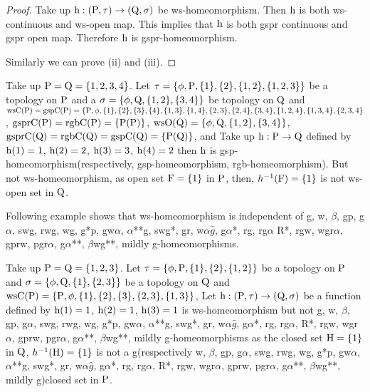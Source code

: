\begin{proof}
Take up $\mathrm{h}: (\mathrm{P},\tau)\to (\mathrm{Q}, \sigma)$ be ws-homeomorphism. Then $\mathrm{h}$ is both ws-continuous and ws-open map. This implies that $\mathrm{h}$ is both gspr continuous and gspr open map. Therefore $\mathrm{h}$ is gspr-homeomorphism.

Similarly we can prove (ii) and (iii).
\end{proof}

\begin{exm}\label{exam5.2.10}
Take up $\mathrm{P}=\mathrm{Q}= \{1, 2, 3,4\}$. Let $\tau= \{\phi, \TSP, \{1\}, \{2\}, \{1, 2\},\break \{1,2,3\}\}$ be a topology on $\mathrm{P}$ and a $\sigma=\{\phi,\mathrm{Q},\{1,2\},\{3,4\}\}$ be topology on $\mathrm{Q}$ and $\ws\TSC(\TSP)=\gsp\TSC(\TSP)=\{\TSP,\phi,\{1\},\{2\},\{3\},\{4\},\{1,3\},\{1,4\},\{2,3\},\{2,4\},\{3,4\},\break \{1,2,4\},\{1,3,4\},\{2,3,4\}$, $\mathrm{gspr}\mathrm{C}(\mathrm{P})=\mathrm{rgb}\mathrm{C}(\mathrm{P})=\{\mathrm{P}(\mathrm{P})\}$, $\ws\TSO(\TSQ)=\{\phi,\TSQ,\{1,2\},\break \{3,4\}\}$, $\mathrm{gspr}\mathrm{C}(\mathrm{Q})=\mathrm{rgb}\mathrm{C}(\mathrm{Q})= \mathrm{gsp}\mathrm{C}(\mathrm{Q})=\{\mathrm{P}(\mathrm{Q})\}$, and Take up $\mathrm{h}: \mathrm{P}\to \mathrm{Q}$ defined by $\mathrm{h}(1)=1$, $\mathrm{h}(2)= 2$, $\mathrm{h}(3)=3$, $\mathrm{h}(4)=2$ then $\mathrm{h}$ is gsp-homeomorphism(respectively, gsp-homeomorphism, rgb-homeomorphism). But not ws-homeomorphism, as open set $\mathrm{F}= \{1\}$ in $\mathrm{P}$, then, $h^{-1} (\mathrm{F}) = \{1\}$ is not ws-open set in $\mathrm{Q}$.
\end{exm}

\begin{rem}\label{rem5.2.11}
Following example shows that ws-homeomorphism is independent of g, w, $\beta$, gp, g$\alpha$, swg, rwg, wg, g*p, gw$\alpha$, $\alpha${*}{*}g, swg*, gr, w$\alpha\hat{g}$, g$\alpha$*, rg, rg$\alpha$ R*, rgw, wgr$\alpha$, gprw, pgr$\alpha$, g$\alpha${*}{*}, $\beta$wg{*}{*}, mildly g-homeomorphisms.
\end{rem}

\begin{exm}\label{exam5.2.12}
Take up $\mathrm{P}=\mathrm{Q}= \{1, 2, 3\}$. Let $\tau= \{\phi, \mathrm{P}, \{1\}, \{2\}, \{1, 2\}\}$ be a topology on $\mathrm{P}$ and $\sigma=\{\phi, \mathrm{Q}, \{1\},\{2,3\}\}$ be a topology on $\mathrm{Q}$ and $\mathrm{ws}\mathrm{C}(\mathrm{P})=\{\mathrm{P}, \phi,\{1\}, \{2\}, \{3\},\{2,3\},\{1, 3\}\}$, Let $\mathrm{h}: (\mathrm{P}, \tau)\to (\mathrm{Q}, \sigma)$ be a function defined by $\mathrm{h}(1)=1$, $\mathrm{h}(2)= 1$, $\mathrm{h}(3)=1$ is ws-homeomorphism but not g, w, $\beta$, gp, g$\alpha$, swg, rwg, wg, g*p, gw$\alpha$, $\alpha${*}{*}g, swg*, gr, w$\alpha\hat{g}$, g$\alpha$*, rg, rg$\alpha$, R*, rgw, wgr$\alpha$, gprw, pgr$\alpha$, g$\alpha${*}{*}, $\beta$wg{*}{*}, mildly g-homeomorphisms as the closed set $\mathrm{H}=\{1\}$ in $\mathrm{Q}$, $h^{-1}(\mathrm{H})=\{1\}$ is not a g(respectively w, $\beta$, gp, g$\alpha$, swg, rwg, wg, g*p, gw$\alpha$, $\alpha${*}{*}g, swg*, gr, w$\alpha\hat{g}$, g$\alpha$*, rg, rg$\alpha$, R*, rgw, wgr$\alpha$, gprw, pgr$\alpha$, g$\alpha${*}{*}, $\beta$wg{*}{*}, mildly g)closed set in $\mathrm{P}$.
\end{exm}

